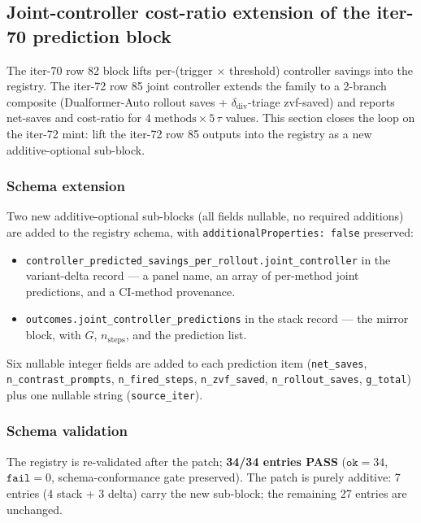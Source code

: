 \subsection{Joint-controller cost-ratio extension of the iter-70 prediction block}\label{sec:p6-joint-controller-extension}

The iter-70 row 82 block lifts per-(trigger $\times$ threshold) controller
savings into the registry. The iter-72 row 85 joint controller
extends the family to a 2-branch composite (Dualformer-Auto rollout
saves + $\delta_\text{div}$-triage zvf-saved) and reports net-saves
and cost-ratio for $4 \text{ methods} \times 5\, \tau$ values. This
section closes the loop on the iter-72 mint: lift the iter-72 row 85
outputs into the registry as a new additive-optional sub-block.

\subsubsection{Schema extension}

Two new additive-optional sub-blocks (all fields nullable, no
required additions) are added to the registry schema, with
\texttt{additionalProperties: false} preserved:

\begin{itemize}
    \item \texttt{controller\_predicted\_savings\_per\_rollout.joint\_controller}
          in the variant-delta record --- a panel name, an array of
          per-method joint predictions, and a CI-method provenance.
    \item \texttt{outcomes.joint\_controller\_predictions} in the
          stack record --- the mirror block, with $G$, $n_\text{steps}$,
          and the prediction list.
\end{itemize}
Six nullable integer fields are added to each prediction item
(\texttt{net\_saves}, \texttt{n\_contrast\_prompts},
\texttt{n\_fired\_steps}, \texttt{n\_zvf\_saved},
\texttt{n\_rollout\_saves}, \texttt{g\_total}) plus one nullable
string (\texttt{source\_iter}).

\subsubsection{Schema validation}

The registry is re-validated after the patch; \textbf{34/34 entries
PASS} ($\texttt{ok}{=}34$, $\texttt{fail}{=}0$, schema-conformance
gate preserved). The patch is purely additive: 7 entries (4 stack +
3 delta) carry the new sub-block; the remaining 27 entries are
unchanged.

